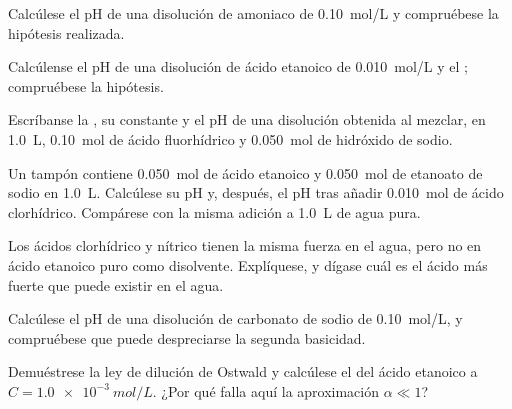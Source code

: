 \begin{exercise}[$\star\star$]\label{exo:b1:predominant-reaction:5}
Calcúlese el pH de una disolución de amoniaco de \qty{0.10}{mol/L} y
compruébese la hipótesis realizada.
\end{exercise}

\begin{exercise}[$\star\star$]\label{exo:b1:predominant-reaction:6}
Calcúlense el pH de una disolución de ácido etanoico de
\qty{0.010}{mol/L} y el ; compruébese la hipótesis.
\end{exercise}

\begin{exercise}[$\star\star$]\label{exo:b1:predominant-reaction:7}
Escríbanse la , su constante y el pH de una
disolución obtenida al mezclar, en \qty{1.0}{L}, \qty{0.10}{mol} de ácido
fluorhídrico y \qty{0.050}{mol} de hidróxido de sodio.
\end{exercise}

\begin{exercise}[$\star\star$]\label{exo:b1:predominant-reaction:8}
Un tampón contiene \qty{0.050}{mol} de ácido etanoico y \qty{0.050}{mol}
de etanoato de sodio en \qty{1.0}{L}. Calcúlese su pH y, después, el pH
tras añadir \qty{0.010}{mol} de ácido clorhídrico. Compárese con la misma
adición a \qty{1.0}{L} de agua pura.
\end{exercise}

\begin{exercise}[$\star\star$]\label{exo:b1:predominant-reaction:9}
Los ácidos clorhídrico y nítrico tienen la misma fuerza en el agua, pero
no en ácido etanoico puro como disolvente. Explíquese, y dígase cuál es
el ácido más fuerte que puede existir en el agua.
\end{exercise}

\begin{exercise}[$\star\star\star$]\label{exo:b1:predominant-reaction:10}
Calcúlese el pH de una disolución de carbonato de sodio de
\qty{0.10}{mol/L}, y compruébese que puede despreciarse la segunda
basicidad.
\end{exercise}

\begin{exercise}[$\star\star\star$]\label{exo:b1:predominant-reaction:11}
Demuéstrese la ley de dilución de Ostwald y calcúlese el  del ácido etanoico a $C = \qty{1.0e-3}{mol/L}$. ¿Por qué falla
aquí la aproximación $\alpha \ll 1$?
\end{exercise}

